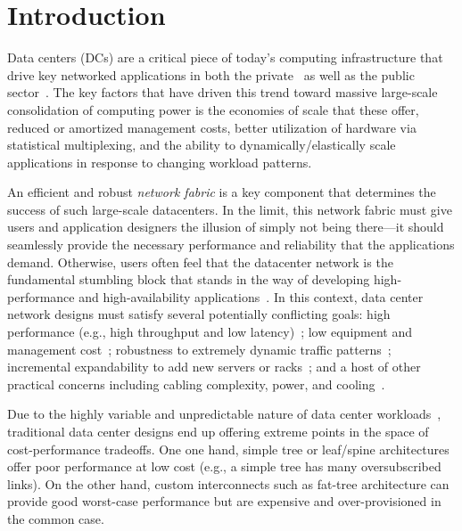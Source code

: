 \section{Introduction}

Data centers (DCs) are a critical piece of today's computing infrastructure
that drive  key networked applications in both the private~\cite{} as well as
the public sector~\cite{}.  The key factors that have driven this trend toward
massive large-scale consolidation of computing power is the economies of scale
that these offer,  reduced or amortized management costs, better utilization of
hardware via statistical multiplexing, and the ability to
dynamically/elastically scale applications in response to changing workload
patterns.  


 An efficient and robust  {\em network fabric} is a key component that
determines the success of such large-scale datacenters.  In the limit, this
network fabric must give users and application designers the illusion of simply
not being there---it should seamlessly provide the necessary performance and
reliability that the applications demand. Otherwise, users often feel that the
datacenter network is the fundamental stumbling block that stands in the way of
developing high-performance and high-availability
applications~\cite{jhamiltonblog}.  In this context, data center network
designs must satisfy several potentially conflicting goals: high performance
(e.g., high throughput and low latency)~\cite{fattree,vl2}; low equipment and
management cost~\cite{fattree,popa-cost}; robustness to extremely dynamic
traffic patterns~\cite{proteus,3db,flyways,cthru}; incremental expandability to
add new servers or racks~\cite{legup,jellyfish}; and a host of  other practical
concerns including cabling complexity, power, and
cooling~\cite{farrington,portland,cabling}.


 Due to the highly variable and unpredictable nature of data center
workloads~\cite{vl2}, traditional  data center designs end up  offering extreme
points in the space of cost-performance tradeoffs.  One one hand, simple tree
or leaf/spine architectures offer  poor performance at low cost (e.g., a simple
tree has many oversubscribed links). On the other hand, custom interconnects
such as fat-tree architecture can provide good worst-case performance but are
expensive and over-provisioned in the common case. 




